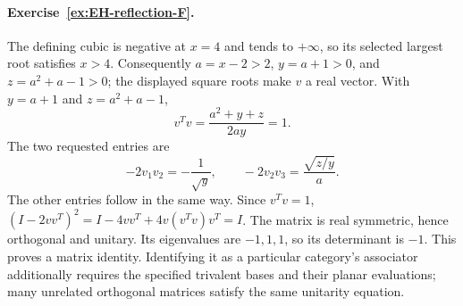 \paragraph{Exercise~\ref{ex:EH-reflection-F}.}
\label{sol:ex:EH-reflection-F}
The defining cubic is negative at $x=4$ and tends to $+\infty$,
so its selected largest root satisfies $x>4$. Consequently
$a=x-2>2$, $y=a+1>0$, and $z=a^2+a-1>0$; the displayed
square roots make $v$ a real vector.
With $y=a+1$ and $z=a^2+a-1$,
\[
 v^Tv=\frac{a^2+y+z}{2ay}=1.
\]
The two requested entries are
\[
 -2v_1v_2=-\frac1{\sqrt y},\qquad
 -2v_2v_3=\frac{\sqrt{z/y}}a.
\]
The other entries follow in the same way. Since $v^Tv=1$,
$(I-2vv^T)^2=I-4vv^T+4v(v^Tv)v^T=I$.
The matrix is real symmetric, hence orthogonal and unitary.
Its eigenvalues are $-1,1,1$, so its determinant is $-1$.
This proves a matrix identity. Identifying it as a particular
category's associator additionally requires the specified
trivalent bases and their planar evaluations; many unrelated
orthogonal matrices satisfy the same unitarity equation.
